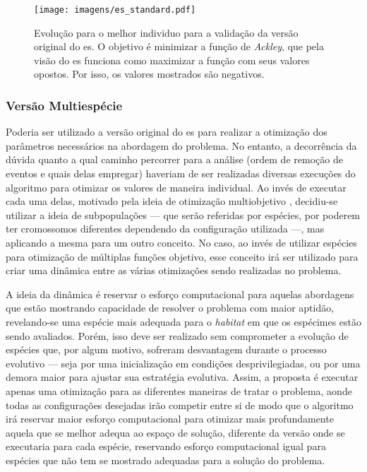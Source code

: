 \begin{figure}[h!t]
\centering
\texttt{[image: imagens/es\_standard.pdf]}
\caption[Evolução para o melhor individuo para a validação da versão
original do ES]{Evolução para o melhor individuo para a validação da versão
original do \acs{es}. O objetivo é minimizar a função de
\emph{Ackley}, que pela visão do \acs{es} funciona como maximizar a
função com seus valores opostos. Por isso, os valores mostrados são
negativos.}
\label{fig:es_standard}
\end{figure}

\subsubsection{Versão Multiespécie}
\label{sssec:multiespecie}

Poderia ser utilizado a versão original do \acs{es} para realizar a
otimização dos parâmetros necessários na abordagem do problema. No
entanto, a decorrência da dúvida quanto a qual caminho
percorrer para a análise (ordem de remoção de eventos e quais delas
empregar) haveriam de ser realizadas diversas execuções
do algoritmo para otimizar os valores de maneira individual. Ao invés
de executar cada uma delas, motivado pela ideia de otimização
multiobjetivo \cite[cap. 9]{eiben2003introduction}, decidiu-se utilizar
a ideia de subpopulações --- que serão referidas por espécies, por
poderem ter cromossomos diferentes dependendo da configuração
utilizada ---, mas aplicando a mesma para um outro conceito. No caso,
ao invés de utilizar espécies para otimização de múltiplas funções
objetivo, esse conceito irá ser utilizado para criar uma dinâmica
entre as várias otimizações sendo realizadas no problema.

A ideia da dinâmica é reservar o esforço computacional para aquelas
abordagens que estão mostrando capacidade de resolver o problema com
maior aptidão, revelando-se uma espécie mais adequada para o
\emph{habitat} em que os espécimes estão sendo avaliados. Porém, isso
deve ser realizado sem comprometer a evolução de espécies que, por
algum motivo, sofreram desvantagem durante o processo evolutivo ---
seja por uma inicialização em condições desprivilegiadas, ou por uma
demora maior para ajustar sua estratégia evolutiva. Assim, a proposta
é executar apenas uma otimização para as diferentes maneiras de
tratar o problema, aonde todas as configurações desejadas irão
competir entre si de modo que o algoritmo irá reservar maior
esforço computacional para otimizar mais profundamente aquela que se
melhor adequa ao espaço de solução, diferente da versão onde se
executaria para cada espécie, reservando esforço computacional igual
para espécies que não tem se mostrado adequadas para a solução do
problema.

